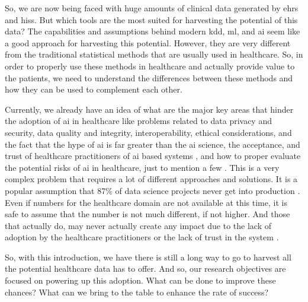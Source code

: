 So, we are now being faced with huge amounts of clinical data generated by \acp{ehr} and \acp{his}. But which tools are the most suited for harvesting the potential of this data? 
The capabilities and assumptions behind modern \ac{kdd}, \ac{ml}, and \ac{ai} seem like a good approach for harvesting this potential. However, they are very different from the traditional statistical methods that are usually used in healthcare.
So, in order to properly use these methods in healthcare and actually provide value to the patients, we need to understand the differences between these methods and how they can be used to complement each other.

Currently, we already have an idea of what are the major key areas that hinder the adoption of \ac{ai} in healthcare like problems related to data privacy and security, data quality and integrity, interoperability, ethical considerations, and the fact that the hype of \ac{ai} is far greater than the \ac{ai} science, the acceptance, and trust of healthcare practitioners of \ac{ai} based systems \cite{muhiyaddinImpactClinicalDecision2020,kilsdonkFactorsInfluencingImplementation2017}, and how to proper evaluate the potential risks of \ac{ai} in healthcare, just to mention a few \cite{topolHighperformanceMedicineConvergence2019a}.
This is a very complex problem that requires a lot of different approaches and solutions. It is a popular assumption that 87\% of data science projects never get into production \cite{Why87Data2019}. Even if numbers for the healthcare domain are not available at this time, it is safe to assume that the number is not much different, if not higher. And those that actually do, may never actually create any impact due to the lack of adoption by the healthcare practitioners or the lack of trust in the system \cite{walkerModelGuidedDecisionMakingThromboprophylaxis2023}.

So, with this introduction, we have there is still a long way to go to harvest all the potential healthcare data has to offer. And so, our research objectives are focused on powering up this adoption. What can be done to improve these chances? What can we bring to the table to enhance the rate of success?






